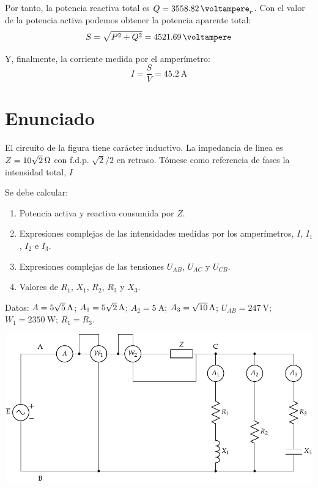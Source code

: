 Por tanto, la potencia reactiva total es $Q = \qty{3558.82}{\voltampere}_r$. Con el valor de la potencia activa podemos obtener la potencia aparente total:
\begin{equation*}
  S = \sqrt{P^2 + Q^2} = \qty{4521.69}{\voltampere}
\end{equation*}

Y, finalmente, la corriente medida por el amperímetro:
\begin{equation*}
  I = \frac{S}{V} = \qty{45.2}{\ampere}
\end{equation*}


\section{Enunciado}
El circuito de la figura tiene carácter inductivo.  La impedancia de
linea es $Z=\qty[parse-numbers=false]{10\sqrt{2}}{\ohm}$ con
f.d.p. $\sqrt{2}/2$ en retraso. Tómese como referencia de fases la
intensidad total, $I$

\vspace{3mm}
Se debe calcular:
\begin{enumerate}

\item Potencia activa y reactiva consumida por $Z$.

\item Expresiones complejas de las intensidades medidas por los
  amperímetros, $I$, $I_1$, $I_2$ e $I_3$. 

\item Expresiones complejas de las tensiones $U_{AB}$, $U_{AC}$ y
  $U_{CB}$.

\item Valores de $R_1$, $X_1$, $R_2$, $R_3$ y $X_3$.

\end{enumerate}

Datos: $A = \qty[parse-numbers = false]{5\sqrt{5}}{\ampere}$; $A_1 = \qty[parse-numbers = false]{5\sqrt{2}}{\ampere}$; $A_2 = \qty{5}{\ampere}$;  $A_3 = \qty[parse-numbers = false]{\sqrt{10}}{\ampere}$;  $U_{AB} = \qty{247}{\volt}$;  $W_1 = \qty{2350}{\watt}$;
$R_1 = R_3$.

\begin{center}
  \includegraphics[width=0.8\linewidth]{figuras/BT2_17.pdf}
\end{center}


